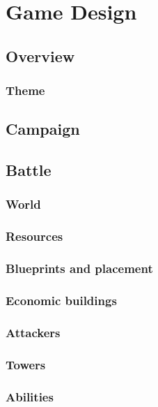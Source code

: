 \chapter{Game Design}
\section{Overview}

\subsection{Theme}

\section{Campaign}

\section{Battle}

\subsection{World}

\subsection{Resources}

\subsection{Blueprints and placement}

\subsection{Economic buildings}

\subsection{Attackers}

\subsection{Towers}

\subsection{Abilities}


